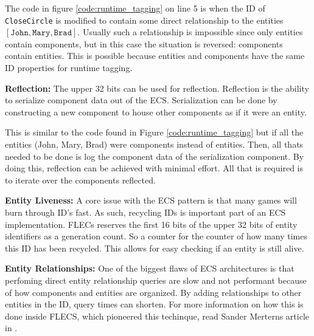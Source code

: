 The code in figure \ref{code:runtime_tagging} on line 5 is when the ID of \texttt{CloseCircle} is modified to contain some direct relationship to the entities $[\texttt{John}, \texttt{Mary}, \texttt{Brad}]$. Usually such a relationship is impossible since only entities contain components, but in this case the situation is reversed: components contain entities. This is possible because entities and components have the same ID properties for runtime tagging.

\textbf{Reflection:}
The upper 32 bits can be used for reflection. Reflection is the ability to serialize component data out of the ECS. Serialization can be done by constructing a new component to house other components as if it were an entity.

This is similar to the code found in Figure \ref{code:runtime_tagging} but if all the entities (John, Mary, Brad) were components instead of entities. Then, all thats needed to be done is log the component data of the serialization component. By doing this, reflection can be achieved with minimal effort. All that is required is to iterate over the components reflected.

\textbf{Entity Liveness:}
A core issue with the ECS pattern is that many games will burn through ID's fast. As such, recycling IDs is important part of an ECS implementation. FLECs reserves the first 16 bits of the upper 32 bits of entity identifiers as a generation count. So a counter for the counter of how many times this ID has been recycled. This allows for easy checking if an entity is still alive.  

\textbf{Entity Relationships:}
One of the biggest flaws of ECS architectures is that perfoming direct entity relationship queries are slow and not performant because of how components and entities are organized. By adding relationships to other entities in the ID, query times can shorten. For more information on how this is done inside FLECS, which pioneered this techinque, read Sander Merterns article in \cite{SanderMertensEntityIDs}.

